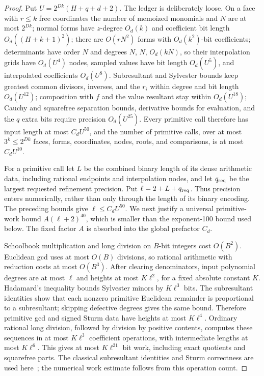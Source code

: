 \begin{proof}
Put $U=2^{Dk}(H+q+d+2)$. The ledger is deliberately loose. On a face with
$r\le k$ free coordinates the number of memoized monomials and $N$ are at most
$2^{Dk}$; normal forms have $z$-degree $O_d(k)$ and coefficient bit length
$O_d((H+k+1)^2)$; there are $O(rN^2)$ forms with $O_d(k^2)$-bit coefficients;
determinants have order $N$ and degrees $N$, $N$, $O_d(kN)$, so their
interpolation grids have $O_d(U^4)$ nodes, sampled values have bit length
$O_d(U^5)$, and interpolated coefficients $O_d(U^8)$. Subresultant and Sylvester
bounds keep greatest common divisors, inverses, and the $r_i$ within degree and
bit length $O_d(U^{12})$; composition with $f$ and the value resultant stay
within $O_d(U^{18})$; Cauchy and squarefree separation bounds, derivative bounds
for evaluation, and the $q$ extra bits require precision $O_d(U^{25})$. Every
primitive call therefore has input length at most $C_dU^{50}$, and the number of
primitive calls, over at most $3^k\le2^{Dk}$ faces, forms, coordinates, nodes,
roots, and comparisons, is at most $C_dU^{10}$.

For a primitive call let $L$ be the combined binary length of its dense
arithmetic data, including rational endpoints and interpolation nodes, and
let $q_{\rm req}$ be the largest requested refinement precision. Put
$\ell=2+L+q_{\rm req}$. Thus precision enters numerically, rather than only
through the length of its binary encoding. The preceding bounds give
$\ell\le C_dU^{50}$. We next justify a universal primitive-work bound
$A(\ell+2)^{40}$, which is smaller than the exponent-100 bound used below.
The fixed factor $A$ is absorbed into the global prefactor $C_d$.

Schoolbook multiplication and long division on $B$-bit integers cost
$O(B^2)$. Euclidean gcd uses at most $O(B)$ divisions, so rational arithmetic
with reduction costs at most $O(B^3)$. After clearing denominators, input
polynomial degrees are at most $\ell$ and heights at most $K\ell^2$, for a
fixed absolute constant $K$. Hadamard's inequality bounds Sylvester minors
by $K\ell^3$ bits. The subresultant identities show that each nonzero
primitive Euclidean remainder is proportional to a subresultant; skipping
defective degrees gives the same bound. Therefore primitive gcd and signed
Sturm data have heights at most $K\ell^4$. Ordinary rational long division,
followed by division by positive contents, computes these sequences in
at most $K\ell^3$ coefficient operations, with intermediate lengths at most
$K\ell^6$. This gives at most $K\ell^{21}$ bit work, including exact
quotients and squarefree parts. The classical subresultant identities and
Sturm correctness are used here~\citep{basu2006-algorithms-in-real-algebraic-geometry};
the numerical work estimate follows from this operation count.


\end{proof}

